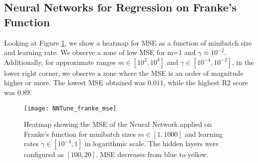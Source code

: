 \subsection{Neural Networks for Regression on Franke's Function}
Looking at Figure \ref{fig:TuneNN_mse}, we show a heatmap for MSE as a function of
minibatch size and learning rate. We observe a zone of low MSE for m=1 and $\gamma\approx 10^{-2}$.
Additionally, for approximate ranges $m\in[10^2, 10^3]$ and $\gamma\in[10^{-4}, 10^{-2}]$, in the lower right corner, we observe a zone where the MSE is an order of magnitude higher or more. The lowest MSE obtained was $0.011$, while the highest R2 score was $0.89$.
\begin{figure}[htbp]
	\centering
	\texttt{[image: NNTune\_franke\_mse]}
	\caption{Heatmap showing the MSE of the Neural Network applied on Franke's function for minibatch sizes $m\in[1, 1000]$ and learning rates $\gamma\in[10^{-4}, 1]$ in logarithmic scale. The hidden layers were configured as $[100, 20]$. MSE decreases from blue to yellow.}
	\label{fig:TuneNN_mse}
\end{figure}
